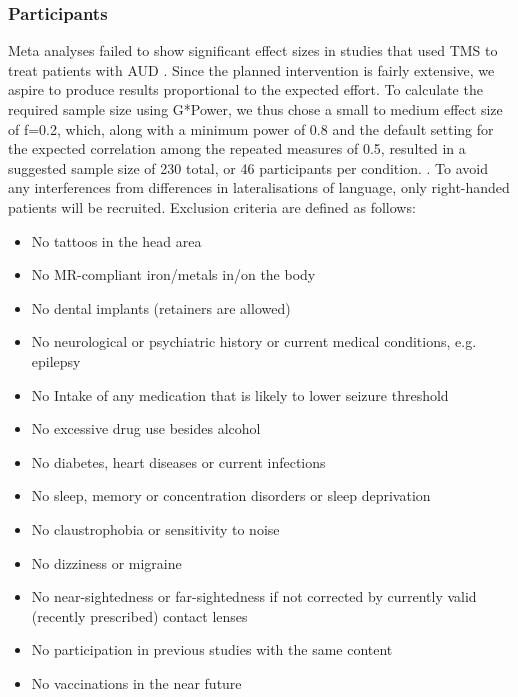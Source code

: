 \documentclass[12pt]{article}
\begin{document}
\subsubsection{Participants}

Meta analyses failed to show significant effect sizes in studies that used TMS to treat patients with AUD \parencite{mostafaviNoninvasiveBrainStimulation2020, zhangEffectsRepetitiveTranscranial2019}. Since the planned intervention is fairly extensive, we aspire to produce results proportional to the expected effort. To calculate the required sample size using G*Power, we thus chose a small to medium effect size of f=0.2, which, along with a minimum power of 0.8 and the default setting for the expected correlation among the repeated measures of 0.5, resulted in a suggested sample size of 230 total, or 46 participants per condition. \parencite{faulStatisticalPowerAnalyses2009, bhaleraoSampleSizeCalculation2010}. 
To avoid any interferences from differences in lateralisations of language, only right-handed patients will be recruited. Exclusion criteria are defined as follows:

\begin{itemize}
\item No tattoos in the head area 
\item No MR-compliant iron/metals in/on the body
\item No dental implants (retainers are allowed)
\item No neurological or psychiatric history or current medical conditions, e.g. epilepsy
\item No Intake of any medication that is likely to lower seizure threshold
\item No excessive drug use besides alcohol
\item No diabetes, heart diseases or current infections
\item No sleep, memory or concentration disorders or sleep deprivation
\item No claustrophobia or sensitivity to noise
\item No dizziness or migraine 
\item No near-sightedness or far-sightedness if not corrected by currently valid (recently prescribed) contact lenses
\item No participation in previous studies with the same content  
\item No vaccinations in the near future 
\end{itemize}
\end{document}
